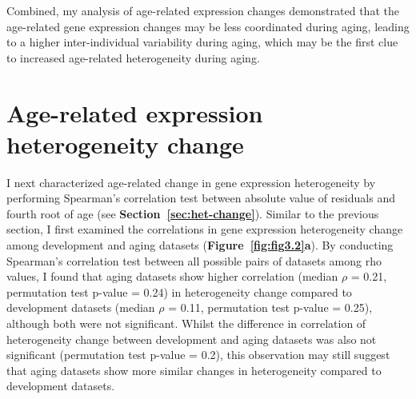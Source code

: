 Combined, my analysis of age-related expression changes demonstrated that the age-related gene expression changes may be less coordinated during aging,
leading to a higher inter-individual variability during aging, which may be the first clue to increased age-related heterogeneity during aging.

\section{Age-related expression heterogeneity change}
I next characterized age-related change in gene expression heterogeneity by performing Spearman's correlation test between absolute value of residuals and fourth root of age (see \textbf{Section~\ref{sec:het-change}}).
Similar to the previous section, I first examined the correlations in gene expression heterogeneity change among development and aging datasets (\textbf{Figure~\ref{fig:fig3.2}a}).
By conducting  Spearman's correlation test between all possible pairs of datasets among rho values, 
I found that aging datasets show higher correlation (median $\rho$ = 0.21, permutation test p-value = 0.24) in heterogeneity change
compared to development datasets (median $\rho$ = 0.11, permutation test p-value = 0.25), although both were not significant.
Whilst the difference in correlation of heterogeneity change between development and aging datasets was also not significant (permutation test p-value = 0.2),
this observation may still suggest that aging datasets show more similar changes in heterogeneity compared to development datasets.


